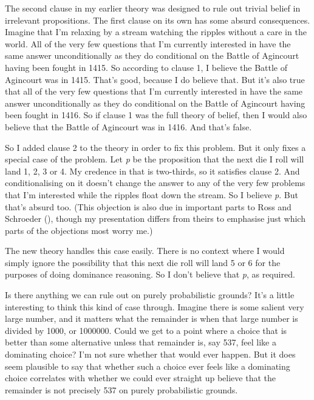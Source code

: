 \documentclass[
  12pt,
  letterpaper,
]{scrbook}
\begin{document}
The second clause in my earlier theory was designed to rule out trivial
belief in irrelevant propositions. The first clause on its own has some
absurd consequences. Imagine that I'm relaxing by a stream watching the
ripples without a care in the world. All of the very few questions that
I'm currently interested in have the same answer unconditionally as they
do conditional on the Battle of Agincourt having been fought in 1415. So
according to clause 1, I believe the Battle of Agincourt was in 1415.
That's good, because I do believe that. But it's also true that all of
the very few questions that I'm currently interested in have the same
answer unconditionally as they do conditional on the Battle of Agincourt
having been fought in 1416. So if clause 1 was the full theory of
belief, then I would also believe that the Battle of Agincourt was in
1416. And that's false.

So I added clause 2 to the theory in order to fix this problem. But it
only fixes a special case of the problem. Let \emph{p} be the
proposition that the next die I roll will land 1, 2, 3 or 4. My credence
in that is two-thirds, so it satisfies clause 2. And conditionalising on
it doesn't change the answer to any of the very few problems that I'm
interested while the ripples float down the stream. So I believe
\emph{p}. But that's absurd too. (This objection is also due in
important parts to Ross and Schroeder
(), though my presentation differs
from theirs to emphasise just which parts of the objections most worry
me.)

The new theory handles this case easily. There is no context where I
would simply ignore the possibility that this next die roll will land 5
or 6 for the purposes of doing dominance reasoning. So I don't believe
that \emph{p}, as required.

Is there anything we can rule out on purely probabilistic grounds? It's
a little interesting to think this kind of case through. Imagine there
is some salient very large number, and it matters what the remainder is
when that large number is divided by 1000, or 1000000. Could we get to a
point where a choice that is better than some alternative unless that
remainder is, say 537, feel like a dominating choice? I'm not sure
whether that would ever happen. But it does seem plausible to say that
whether such a choice ever feels like a dominating choice correlates
with whether we could ever straight up believe that the remainder is not
precisely 537 on purely probabilistic grounds.
\end{document}
